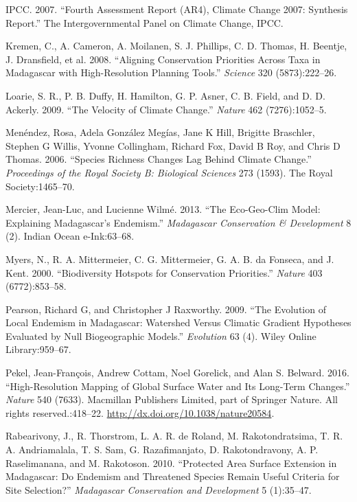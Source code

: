 \documentclass[12pt,]{article}
\begin{document}
\leavevmode\hypertarget{ref-IPCC2007}{}%
IPCC. 2007. ``Fourth Assessment Report (AR4), Climate Change 2007:
Synthesis Report.'' The Intergovernmental Panel on Climate Change, IPCC.

\leavevmode\hypertarget{ref-Kremen2008}{}%
Kremen, C., A. Cameron, A. Moilanen, S. J. Phillips, C. D. Thomas, H.
Beentje, J. Dransfield, et al. 2008. ``Aligning Conservation Priorities
Across Taxa in Madagascar with High-Resolution Planning Tools.''
\emph{Science} 320 (5873):222--26.

\leavevmode\hypertarget{ref-Loarie2009}{}%
Loarie, S. R., P. B. Duffy, H. Hamilton, G. P. Asner, C. B. Field, and
D. D. Ackerly. 2009. ``The Velocity of Climate Change.'' \emph{Nature}
462 (7276):1052--5.

\leavevmode\hypertarget{ref-Menendez2006}{}%
Menéndez, Rosa, Adela González Megías, Jane K Hill, Brigitte Braschler,
Stephen G Willis, Yvonne Collingham, Richard Fox, David B Roy, and Chris
D Thomas. 2006. ``Species Richness Changes Lag Behind Climate Change.''
\emph{Proceedings of the Royal Society B: Biological Sciences} 273
(1593). The Royal Society:1465--70.

\leavevmode\hypertarget{ref-Mercier2013}{}%
Mercier, Jean-Luc, and Lucienne Wilmé. 2013. ``The Eco-Geo-Clim Model:
Explaining Madagascar's Endemism.'' \emph{Madagascar Conservation \&
Development} 8 (2). Indian Ocean e-Ink:63--68.

\leavevmode\hypertarget{ref-Myers2000}{}%
Myers, N., R. A. Mittermeier, C. G. Mittermeier, G. A. B. da Fonseca,
and J. Kent. 2000. ``Biodiversity Hotspots for Conservation
Priorities.'' \emph{Nature} 403 (6772):853--58.

\leavevmode\hypertarget{ref-Pearson2009}{}%
Pearson, Richard G, and Christopher J Raxworthy. 2009. ``The Evolution
of Local Endemism in Madagascar: Watershed Versus Climatic Gradient
Hypotheses Evaluated by Null Biogeographic Models.'' \emph{Evolution} 63
(4). Wiley Online Library:959--67.

\leavevmode\hypertarget{ref-Pekel2016}{}%
Pekel, Jean-François, Andrew Cottam, Noel Gorelick, and Alan S. Belward.
2016. ``High-Resolution Mapping of Global Surface Water and Its
Long-Term Changes.'' \emph{Nature} 540 (7633). Macmillan Publishers
Limited, part of Springer Nature. All rights reserved.:418--22.
\url{http://dx.doi.org/10.1038/nature20584}.

\leavevmode\hypertarget{ref-Rabearivony2010}{}%
Rabearivony, J., R. Thorstrom, L. A. R. de Roland, M. Rakotondratsima,
T. R. A. Andriamalala, T. S. Sam, G. Razafimanjato, D. Rakotondravony,
A. P. Raselimanana, and M. Rakotoson. 2010. ``Protected Area Surface
Extension in Madagascar: Do Endemism and Threatened Species Remain
Useful Criteria for Site Selection?'' \emph{Madagascar Conservation and
Development} 5 (1):35--47.
\end{document}
